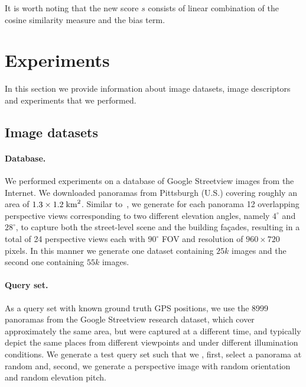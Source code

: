      \noindent
      It is worth noting that the new score $s$ consists of linear combination of the cosine similarity measure and the bias term.


\section{Experiments}
\label{sec:experiments}
   In this section we provide information about image datasets, image descriptors and experiments that we performed.
        \subsection{Image datasets}
        \paragraph{Database.}
        We performed experiments on a database of Google Streetview images from the Internet. We downloaded panoramas from Pittsburgh (U.S.) covering roughly an area of $1.3 \times 1.2 \; {\rm km}^2$. Similar to~\cite{Chen11}, we generate for each panorama 12 overlapping perspective views corresponding to two different elevation angles, namely $4^\circ$ and $28^\circ$, to capture both the street-level scene and the building fa\c{c}ades, resulting in a total of 24 perspective views each with $90^\circ$ FOV and resolution of $960 \times 720$ pixels. In this manner we generate one dataset containing $25k$ images and the second one containing $55k$ images.

        \paragraph{Query set.}
        As a query set with known ground truth GPS positions, we use the 8999 panoramas from the Google Streetview research dataset, which cover approximately the same area, but were captured at a different time, and typically depict the same places from different viewpoints and under different illumination conditions. We generate a test query set such that we , first, select a panorama at random and, second, we generate a perspective image with random orientation and random elevation pitch. 


